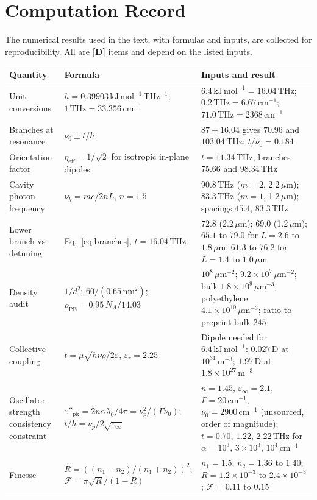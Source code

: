 \documentclass[11pt]{article}
\newcommand{\stD}{\textbf{\textcolor{green!40!black}{[D]}}}
\newcommand{\thz}{\,\mathrm{THz}}
\newcommand{\kjm}{\,\mathrm{kJ\,mol^{-1}}}
\newcommand{\cmi}{\,\mathrm{cm^{-1}}}
\theoremstyle{plain}
\theoremstyle{definition}
\theoremstyle{remark}
\begin{document}
\appendix
\section{Computation Record}

The numerical results used in the text, with formulas and inputs, are collected for reproducibility. All are \stD{} items and depend on the listed inputs.

\begin{table}[ht]
\centering
\small
\begin{tabularx}{\textwidth}{@{}p{3.3cm}p{4.2cm}X@{}}
\toprule
Quantity & Formula & Inputs and result \\
\midrule
Unit conversions & $h=0.39903\kjm\thz^{-1}$; $1\thz=33.356\cmi$ & $6.4\kjm=16.04\thz$; $0.2\thz=6.67\cmi$; $71.0\thz=2368\cmi$ \\
Branches at resonance & $\nu_0\pm t/h$ & $87\pm16.04$ gives $70.96$ and $103.04\thz$; $t/\nu_0=0.184$ \\
Orientation factor & $\eta_{\mathrm{eff}}=1/\sqrt2$ for isotropic in-plane dipoles & $t=11.34\thz$; branches $75.66$ and $98.34\thz$ \\
Cavity photon frequency & $\nu_k=mc/2nL$, $n=1.5$ & $90.8\thz$ ($m=2$, 2.2\,$\mu$m); $83.3\thz$ ($m=1$, 1.2\,$\mu$m); spacings $45.4$, $83.3\thz$ \\
Lower branch vs detuning & Eq.~\eqref{eq:branches}, $t=16.04\thz$ & $72.8$ (2.2\,$\mu$m); $69.0$ (1.2\,$\mu$m); $65.1$ to $79.0$ for $L=2.6$ to $1.8\,\mu$m; $61.3$ to $76.2$ for $L=1.4$ to $1.0\,\mu$m \\
Density audit & $1/d^2$; $60/(0.65\,\mathrm{nm}^2)$; $\rho_{\mathrm{PE}}=0.95\,N_A/14.03$ & $10^{8}\,\mu\mathrm{m}^{-2}$; $9.2\times10^{7}\,\mu\mathrm{m}^{-2}$; bulk $1.8\times10^{9}\,\mu\mathrm{m}^{-3}$; polyethylene $4.1\times10^{10}\,\mu\mathrm{m}^{-3}$; ratio to preprint bulk $245$ \\
Collective coupling & $t=\mu\sqrt{h\nu\rho/2\varepsilon}$, $\varepsilon_r=2.25$ & Dipole needed for $6.4\kjm$: $0.027$\,D at $10^{31}\,\mathrm{m}^{-3}$; $1.97$\,D at $1.8\times10^{27}\,\mathrm{m}^{-3}$ \\
Oscillator-strength consistency constraint & $\varepsilon''_{\mathrm{pk}}=2n\alpha\lambda_0/4\pi=\nu_p^2/(\Gamma\nu_0)$; $t/h=\nu_p/2\sqrt{\varepsilon_\infty}$ & $n=1.45$, $\varepsilon_\infty=2.1$, $\Gamma=20\cmi$, $\nu_0=2900\cmi$ (unsourced, order of magnitude); $t=0.70$, $1.22$, $2.22\thz$ for $\alpha=10^3$, $3\times10^3$, $10^4\cmi$ \\
Finesse & $R=((n_1-n_2)/(n_1+n_2))^2$; $\mathcal F=\pi\sqrt R/(1-R)$ & $n_1=1.5$; $n_2=1.36$ to $1.40$; $R=1.2\times10^{-3}$ to $2.4\times10^{-3}$; $\mathcal F=0.11$ to $0.15$ \\

\end{tabularx}
\end{table}
\end{document}
